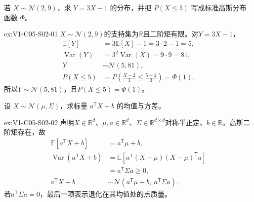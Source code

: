 \begin{SLChapterExercisePairSection}
\begin{exercise}\label{ex:V1-C05-S02-01}
若 $X\sim\mathcal N(2,9)$，求 $Y=3X-1$ 的分布，并把 $P(X\le5)$ 写成标准高斯分布函数 $\Phi$。
\end{exercise}
\label{sol:V1-C05-S02-01}
\begin{chapterexercisesolution}{ex:V1-C05-S02-01}
$X\sim\mathcal N(2,9)$的支持集为$\mathbb R$且二阶矩有限。对$Y=3X-1$，
\[
\begin{aligned}
\mathbb E[Y]&=3\mathbb E[X]-1=3\cdot2-1=5,\\
\operatorname{Var}(Y)&=3^2\operatorname{Var}(X)=9\cdot9=81,\\
Y&\sim\mathcal N(5,81),\\
P(X\le5)
&=P\left(\frac{X-2}{3}\le\frac{5-2}{3}\right)=\Phi(1).
\end{aligned}
\]
所以$Y\sim\mathcal N(5,81)$，且$P(X\le5)=\Phi(1)$。
\end{chapterexercisesolution}

\begin{exercise}\label{ex:V1-C05-S02-02}
设 $X\sim\mathcal N(\mu,\Sigma)$，求标量 $a^{\mathsf T}X+b$ 的均值与方差。
\end{exercise}
\label{sol:V1-C05-S02-02}
\begin{chapterexercisesolution}{ex:V1-C05-S02-02}
声明$X\in\mathbb R^d$、$\mu,a\in\mathbb R^d$、$\Sigma\in\mathbb R^{d\times d}$对称半正定、$b\in\mathbb R$。高斯二阶矩存在，故
\[
\begin{aligned}
\mathbb E[a^{\mathsf T}X+b]&=a^{\mathsf T}\mu+b,\\
\operatorname{Var}(a^{\mathsf T}X+b)
&=\mathbb E\!\left[a^{\mathsf T}(X-\mu)(X-\mu)^{\mathsf T}a\right]\\
&=a^{\mathsf T}\Sigma a\ge0,\\
a^{\mathsf T}X+b
&\sim\mathcal N(a^{\mathsf T}\mu+b,\ a^{\mathsf T}\Sigma a).
\end{aligned}
\]
若$a^{\mathsf T}\Sigma a=0$，最后一项表示退化在其均值处的点质量。
\end{chapterexercisesolution}


\end{SLChapterExercisePairSection}
